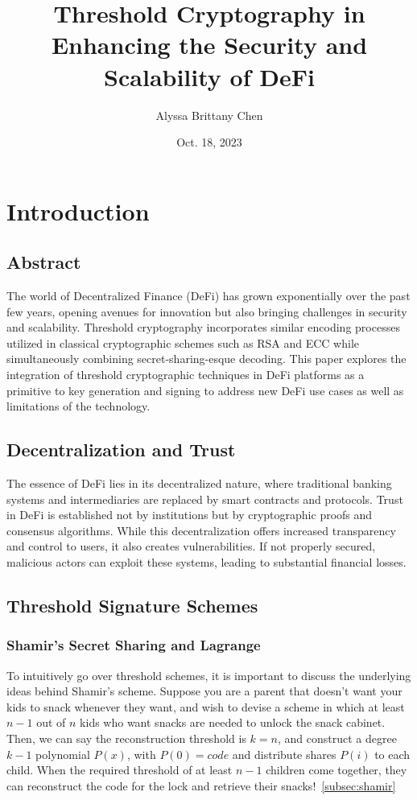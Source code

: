 \documentclass[12pt]{article}
\title{Threshold Cryptography in Enhancing the Security and Scalability of DeFi}
\author{Alyssa Brittany Chen}
\date{Oct. 18, 2023}
\begin{document}
\maketitle


\tableofcontents

\newpage

\section{Introduction}


\subsection{Abstract}
The world of Decentralized Finance (DeFi) has grown exponentially over the past few years, opening avenues for innovation but also bringing challenges in security and scalability. Threshold cryptography incorporates similar encoding processes utilized in classical cryptographic schemes such as RSA and ECC while simultaneously combining secret-sharing-esque decoding. This paper explores the integration of threshold cryptographic techniques in DeFi platforms as a primitive to key generation and signing to address new DeFi use cases as well as limitations of the technology.

\subsection{Decentralization and Trust}
The essence of DeFi lies in its decentralized nature, where traditional banking systems and intermediaries are replaced by smart contracts and protocols. Trust in DeFi is established not by institutions but by cryptographic proofs and consensus algorithms. While this decentralization offers increased transparency and control to users, it also creates vulnerabilities. If not properly secured, malicious actors can exploit these systems, leading to substantial financial losses.


\subsection{Threshold Signature Schemes}
\subsubsection{Shamir's Secret Sharing and Lagrange}
To intuitively go over threshold schemes, it is important to discuss the underlying ideas behind Shamir's scheme. Suppose you are a parent that doesn't want your kids to snack whenever they want, and wish to devise a scheme in which at least \(n-1\) out of \(n\) kids who want snacks are needed to unlock the snack cabinet. Then, we can say the reconstruction threshold is \(k=n\), and construct a degree \(k-1\) polynomial \(P(x)\), with \(P(0)=code\) and distribute shares \(P(i)\) to each child. When the required threshold of at least \(n-1\) children come together, they can reconstruct the code for the lock and retrieve their snacks!~\ref{subsec:shamir}
\end{document}
